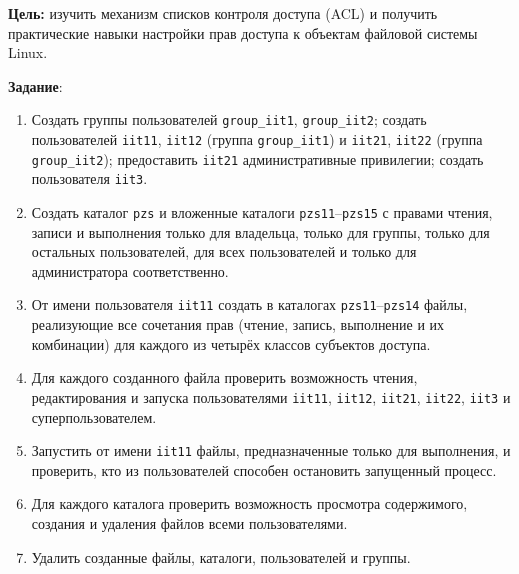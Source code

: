 
\textbf{Цель:} изучить механизм списков контроля доступа (ACL) и получить
практические навыки настройки прав доступа к объектам файловой системы
Linux.

\vspace{1em}

\textbf{Задание}:
\begin{enumerate}
  \item Создать группы пользователей \texttt{group\_iit1}, \texttt{group\_iit2};
  создать пользователей \texttt{iit11}, \texttt{iit12} (группа \texttt{group\_iit1})
  и \texttt{iit21}, \texttt{iit22} (группа \texttt{group\_iit2}); предоставить
  \texttt{iit21} административные привилегии; создать пользователя \texttt{iit3}.
  \item Создать каталог \texttt{pzs} и вложенные каталоги \texttt{pzs11}--\texttt{pzs15}
  с правами чтения, записи и выполнения только для владельца, только для группы,
  только для остальных пользователей, для всех пользователей и только для
  администратора соответственно.
  \item От имени пользователя \texttt{iit11} создать в каталогах
  \texttt{pzs11}--\texttt{pzs14} файлы, реализующие все сочетания прав (чтение,
  запись, выполнение и их комбинации) для каждого из четырёх классов субъектов
  доступа.
  \item Для каждого созданного файла проверить возможность чтения, редактирования
  и запуска пользователями \texttt{iit11}, \texttt{iit12}, \texttt{iit21},
  \texttt{iit22}, \texttt{iit3} и суперпользователем.
  \item Запустить от имени \texttt{iit11} файлы, предназначенные только для
  выполнения, и проверить, кто из пользователей способен остановить запущенный
  процесс.
  \item Для каждого каталога проверить возможность просмотра содержимого,
  создания и удаления файлов всеми пользователями.
  \item Удалить созданные файлы, каталоги, пользователей и группы.
\end{enumerate}
